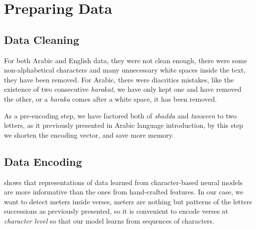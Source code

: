 \documentclass[12pt]{report}
\begin{document}
\section{Preparing Data}


\subsection{Data Cleaning}

For both Arabic and English data, they were not clean enough, there were some
non-alphabetical characters and many unnecessary white spaces inside the text,
they have been removed.  For Arabic, there were diacritics mistakes, like the
existence of two consecutive \textit{harakat}, we have only kept one and have
removed the other, or a \textit{haraka} comes after a white space, it has been
removed. 

As a pre-encoding step, we have factored both of \textit{shadda} and
\textit{tanween} to two letters, as it previously presented in Arabic language
introduction,  by this step we shorten the encoding vector, and save more memory.


\subsection{Data Encoding}
\citet{Agirrezabal2017} shows that representations of data learned from
character-based neural models are more informative than the ones from
hand-crafted features. 
In our case, we want to detect meters inside verses, meters are nothing but
patterns of the letters successions as previously presented, so it is convenient
to encode verses at \textit{character level} so that our model learns from
sequences of characters.
\end{document}
